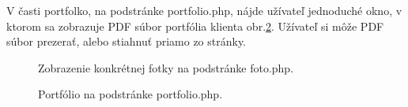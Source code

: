 \vspace{2cm}

V časti portfolko, na podstránke portfolio.php, nájde užívateľ jednoduché okno, v ktorom sa zobrazuje PDF súbor portfólia klienta obr.\ref{OBRAZOK 1.7}. Užívateľ si môže PDF súbor prezerať, alebo stiahnuť priamo zo stránky.

\begin{figure}[!tbh]
\centering
\setlength{\fboxsep}{0pt}%
\setlength{\fboxrule}{1pt}%
\caption{Zobrazenie konkrétnej fotky na podstránke foto.php.}\label{OBRAZOK 1.6}
\end{figure}



\begin{figure}[!tbh]
\centering
\setlength{\fboxsep}{0pt}%
\setlength{\fboxrule}{1pt}%
\caption{Portfólio na podstránke portfolio.php.}\label{OBRAZOK 1.7}
\end{figure}





